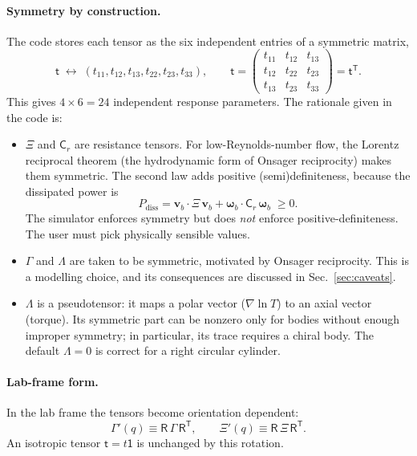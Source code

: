 \documentclass[11pt]{article}
\newcommand{\vect}[1]{\bm{#1}}
\newcommand{\tens}[1]{\mathsf{#1}}
\newcommand{\Rm}{\tens{R}}
\newcommand{\T}{^{\mathsf{T}}}
\theoremstyle{remark}
\begin{document}
\paragraph{Symmetry by construction.} The code stores each tensor as the
six independent entries of a symmetric matrix,
\begin{equation}
  \tens{t} \;\longleftrightarrow\; (t_{11},t_{12},t_{13},t_{22},t_{23},t_{33}),
  \qquad
  \tens{t} =
  \begin{pmatrix}
    t_{11} & t_{12} & t_{13}\\
    t_{12} & t_{22} & t_{23}\\
    t_{13} & t_{23} & t_{33}
  \end{pmatrix}
  = \tens{t}\T .
\end{equation}
This gives $4\times6=24$ independent response parameters. The rationale
given in the code is:
\begin{itemize}
  \item $\tens{\Xi}$ and $\tens{C}_r$ are resistance tensors. For
        low-Reynolds-number flow, the Lorentz reciprocal theorem (the
        hydrodynamic form of Onsager reciprocity) makes them symmetric.
        The second law adds positive (semi)definiteness, because the
        dissipated power is
        \begin{equation}
          P_{\text{diss}} = \vect{v}_b\cdot\tens{\Xi}\,\vect{v}_b
                          + \vect{\omega}_b\cdot\tens{C}_r\,\vect{\omega}_b \;\ge 0 .
        \end{equation}
        The simulator enforces symmetry but does \emph{not} enforce
        positive-definiteness. The user must pick physically sensible
        values.
  \item $\tens{\Gamma}$ and $\tens{\Lambda}$ are taken to be symmetric,
        motivated by Onsager reciprocity. This is a modelling choice, and
        its consequences are discussed in Sec.~\ref{sec:caveats}.
  \item $\tens{\Lambda}$ is a pseudotensor: it maps a polar vector
        ($\nabla\ln T$) to an axial vector (torque). Its symmetric part
        can be nonzero only for bodies without enough improper symmetry;
        in particular, its trace requires a chiral body. The default
        $\tens{\Lambda}=0$ is correct for a right circular cylinder.
\end{itemize}

\paragraph{Lab-frame form.} In the lab frame the tensors become
orientation dependent:
\begin{equation}
  \tens{\Gamma}'(q) \equiv \Rm\,\tens{\Gamma}\,\Rm\T, \qquad
  \tens{\Xi}'(q) \equiv \Rm\,\tens{\Xi}\,\Rm\T .
\end{equation}
An isotropic tensor $\tens{t}=t\tens{1}$ is unchanged by this rotation.
\end{document}
